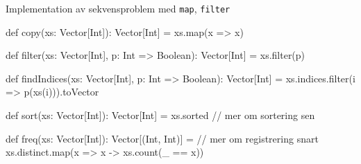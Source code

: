 \begin{Slide}{Implementation av sekvensproblem med \texttt{map}, \texttt{filter}}
\begin{Code}
def copy(xs: Vector[Int]): Vector[Int] = xs.map(x => x)

def filter(xs: Vector[Int], p: Int => Boolean): Vector[Int] = xs.filter(p)

def findIndices(xs: Vector[Int], p: Int => Boolean): Vector[Int] =
  xs.indices.filter(i => p(xs(i))).toVector

def sort(xs: Vector[Int]): Vector[Int] = xs.sorted // mer om sortering sen

def freq(xs: Vector[Int]): Vector[(Int, Int)] = // mer om registrering snart
  xs.distinct.map(x => x -> xs.count(_ == x))
\end{Code}
\end{Slide}


